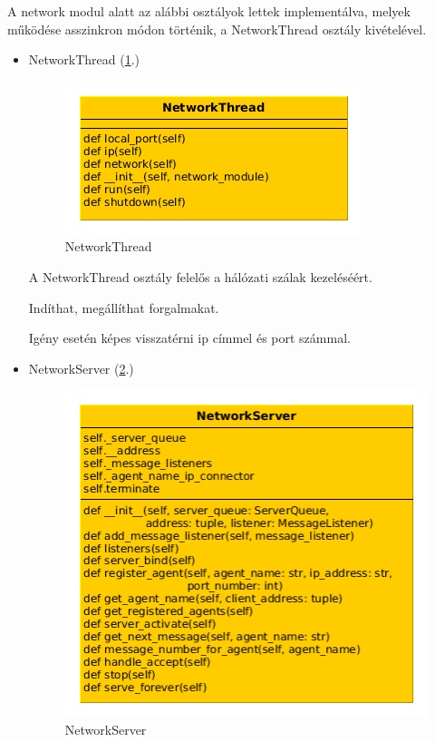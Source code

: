\documentclass[a4paper,12pt,oneside]{report}
\begin{document}
A network modul alatt az alábbi osztályok lettek implementálva, melyek működése asszinkron módon történik, a NetworkThread osztály kivételével.

\begin{itemize}
	\itemsep0em
		\item NetworkThread (\ref{fig:networkthread}.)
			\begin{figure}[h]
			  \includegraphics[keepaspectratio]{networkthread.png}
			  \caption{NetworkThread}
			  \label{fig:networkthread}
			\end{figure}
			
			A NetworkThread osztály felelős a hálózati szálak kezeléséért.

			Indíthat, megállíthat forgalmakat.
			
			Igény esetén képes visszatérni ip címmel és port számmal.
			
			\newpage
		\item NetworkServer (\ref{fig:networkserver}.)
			\begin{figure}[h]
			  \includegraphics[width=13cm, keepaspectratio]{networkserver.png}
			  \caption{NetworkServer}
			  \label{fig:networkserver}
			\end{figure}
   

\end{itemize}
\end{document}
